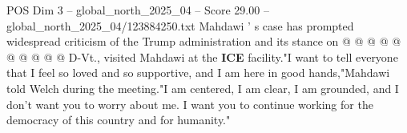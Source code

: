 \begin{textsample}{POS Dim 3 – global\_north\_2025\_04 – Score 29.00 – global\_north\_2025\_04/123884250.txt}
Mahdawi ' s case has prompted widespread criticism of the Trump administration and its stance on @ @ @ @ @ @ @ @ @ @ D-Vt., visited Mahdawi at the \textbf{ICE} facility."I want to tell everyone that I feel so loved and so supportive, and I am here in good hands,"Mahdawi told Welch during the meeting."I am centered, I am clear, I am grounded, and I don't want you to worry about me.
I want you to continue working for the democracy of this country and for humanity."

\end{textsample}
